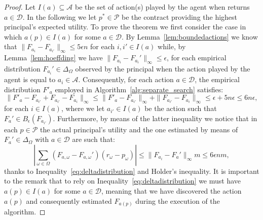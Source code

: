 \epsilonsolution*
\begin{proof}
    Let $I(a) \subseteq \mathcal{A}$ be the set of action(s) played by the agent when \ActionOracle returns $a \in \mathcal{D}$. In the following we let $p^* \in \mathcal{P}$ be the contract providing the highest principal's expected utility. To prove the theorem we first consider the case in which $a(p) \in I(a)$ for some $a \in \mathcal{D}$. By Lemma~\ref{lem:boundedactions} we know that $\| F_{a_i} - F_{a_{i'}} \|_{\infty} \le 5\epsilon n $ for each $i,i' \in I(a)$ while, by Lemma~\ref{lem:hoeffding} we have $\| F_{a_i} - F_{a_i}' \|_{\infty} \le \epsilon$, for each empirical distribution $F_{a_i}' \in \Delta_{\Omega}$ observed by the principal when the action played by the agent is equal to $a_i \in \mathcal{A}$. Consequently, for each action $a \in \mathcal{D}$,
    the empirical distribution $F'_{a}$ employed in Algorithm~\ref{alg:separate_search} satisfies:
    \begin{equation}\label{eq:deltadistribution}
        \| F'_{a} - F_{a_{i'}} + F_{a_{i'}} - F_{a_{i}} \|_{\infty} \le \| F'_{a} - F_{a_{i'}}\|_{\infty} + \| F_{a_{i'}} - F_{a_{i}} \|_{\infty} \le  \epsilon + 5 n \epsilon  \le 6 n \epsilon ,
    \end{equation}
    for each $i \in I(a)$, where we let $a_{i'} \in I(a)$ be the action such that $F_a' \in B_{\epsilon}(F_{a_{i'}})$. Furthermore, by means of the latter inequality we notice that in each $p \in \mathcal{P}$ the actual principal's utility and the one estimated by means of $F_{a}' \in \Delta_{\Omega}$ with $a \in \mathcal{D}$ are such that:
    \begin{equation*}
        |  \sum_{\omega  \in \Omega }  (F_{a,\omega} - F_{a,\omega}' )  \left(  r_\omega - {p}_\omega \right) | \le \| F_{a_i} - F_{a}' \|_{\infty} m \le 6 \epsilon n m,
    \end{equation*}
    thanks to Inequality~\ref{eq:deltadistribution} and Holder's inequality. It is important to the remark that to rely on Inequality~\ref{eq:deltadistribution} we must have $a(p) \in I(a)$ for some $a \in \mathcal{D}$, meaning that we have discovered the action $a(p)$ and consequently estimated $F_{a(p)}$ during the execution of the algorithm. 
    

\end{proof}
